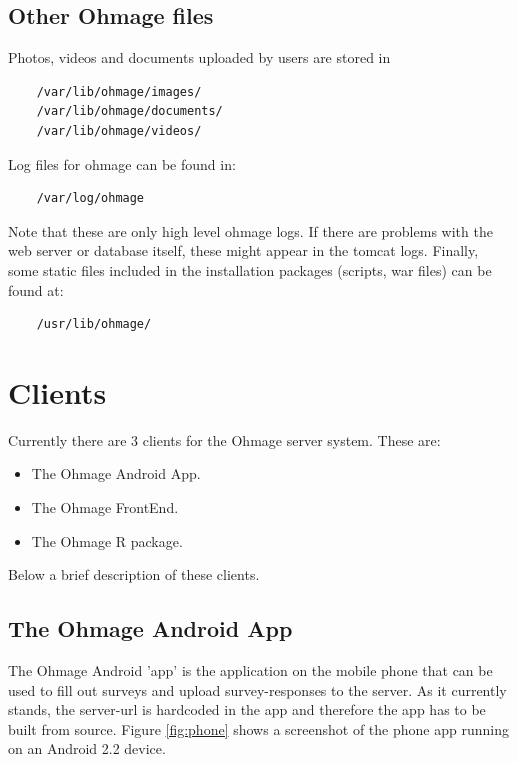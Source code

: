\documentclass{scrartcl}
\begin{document}
\subsection{Other Ohmage files}

Photos, videos and documents uploaded by users are stored in

\begin{verbatim}
    /var/lib/ohmage/images/
    /var/lib/ohmage/documents/
    /var/lib/ohmage/videos/
\end{verbatim}
Log files for ohmage can be found in:

\begin{verbatim}
    /var/log/ohmage
\end{verbatim}

\noindent Note that these are only high level ohmage logs. If there are problems
with the web server or database itself, these might appear in the tomcat logs. 
Finally, some static files included in the installation packages (scripts,
war files) can be found at:

\begin{verbatim}
    /usr/lib/ohmage/
\end{verbatim}

\section{Clients}

Currently there are 3 clients for the Ohmage server system. These are:

\begin{itemize}
  \item The Ohmage Android App.
  \item The Ohmage FrontEnd.
  \item The Ohmage R package.
\end{itemize}
Below a brief description of these clients.

\subsection{The Ohmage Android App}

The Ohmage Android 'app' is the application on the mobile phone that can be used
to fill out surveys and upload survey-responses to the server. As it currently
stands, the server-url is hardcoded in the app and therefore the app has to be
built from source. Figure \ref{fig:phone} shows a screenshot of the phone app running on
an Android 2.2 device. \\
\end{document}
